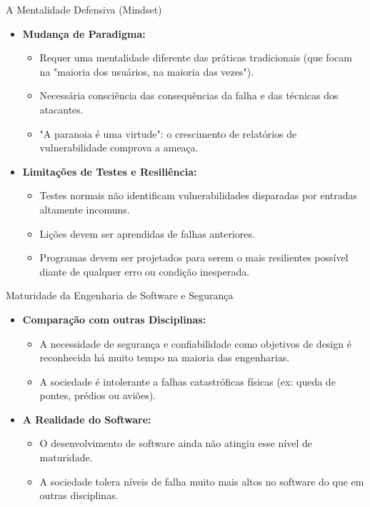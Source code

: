 \begin{frame}{A Mentalidade Defensiva (Mindset)}
    \begin{itemize}
        \item \textbf{Mudança de Paradigma:}
              \begin{itemize}
                  \item Requer uma mentalidade diferente das práticas tradicionais (que focam na "maioria dos usuários, na maioria das vezes").
                  \item Necessária consciência das consequências da falha e das técnicas dos atacantes.
                  \item "A paranoia é uma virtude": o crescimento de relatórios de vulnerabilidade comprova a ameaça.
              \end{itemize}

        \item \textbf{Limitações de Testes e Resiliência:}
              \begin{itemize}
                  \item Testes normais não identificam vulnerabilidades disparadas por entradas altamente incomuns.
                  \item Lições devem ser aprendidas de falhas anteriores.
                  \item Programas devem ser projetados para serem o mais resilientes possível diante de qualquer erro ou condição inesperada.
              \end{itemize}
    \end{itemize}
\end{frame}

\begin{frame}{Maturidade da Engenharia de Software e Segurança}
    \begin{itemize}
        \item \textbf{Comparação com outras Disciplinas:}
              \begin{itemize}
                  \item A necessidade de segurança e confiabilidade como objetivos de design é reconhecida há muito tempo na maioria das engenharias.
                  \item A sociedade é intolerante a falhas catastróficas físicas (ex: queda de pontes, prédios ou aviões).
              \end{itemize}

        \item \textbf{A Realidade do Software:}
              \begin{itemize}
                  \item O desenvolvimento de software ainda não atingiu esse nível de maturidade.
                  \item A sociedade tolera níveis de falha muito mais altos no software do que em outras disciplinas.
              \end{itemize}
    \end{itemize}
\end{frame}

